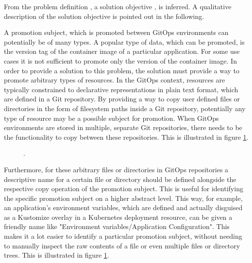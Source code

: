 From the problem definition
\textit{},
a solution objective
\textit{},
is inferred.
A qualitative description of the solution objective
is pointed out in the following.

A promotion subject, which is promoted between GitOps environments can potentially
be of many types. A popular type of data, which can be promoted,
is the version tag of the container image of a particular application.
For some use cases it is not sufficient to promote only the version of the container image.
In order to provide a solution to this problem,
the solution must provide a way to promote arbitrary types of resources.
In the GitOps context, resources are typically constrained to declarative
representations in plain text format, which are defined in a Git repository.
By providing a way to copy user defined files or directories in the form
of filesystem paths inside a Git repository,
potentially any type of resource may be a possible subject for promotion.
When GitOps environments are stored in multiple, separate Git repositories,
there needs to be the functionality to copy between these repositories.
This is illustrated in figure \ref{fig:OBJ1R1-and-OBJ1R2}.
%

\begin{figure}[h]
	\centering
	\caption{.
	}
	\label{fig:OBJ1R1-and-OBJ1R2}	
\end{figure}

Furthermore, for these arbitrary files or directories in GitOps repositories
a descriptive name for a certain file or directory
should be defined alongside the
respective copy operation of the promotion subject.
This is useful for identifying the specific promotion subject
on a higher abstract level.
This way, for example, an application's environment variables,
which are defined and actually disguised as a Kustomize overlay in a Kubernetes deployment resource,
can be given a friendly name like "Environment variables/Application Configuration".
This makes it a lot easier to identify a particular promotion subject, without
needing to manually inspect the raw contents of a file or even multiple files or
directory trees.
This is illustrated in figure \ref{fig:OBJ1R1-and-OBJ1R2}.

